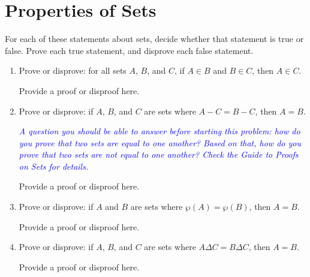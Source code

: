 \documentclass{article}
\renewcommand{\(}{\left(}
\renewcommand{\)}{\right)}
\theoremstyle{plain}
\theoremstyle{plain}
\theoremstyle{definition}
\begin{document}
\section{Properties of Sets}

For each of these statements about sets, decide whether that statement is true or false. Prove each true statement, and disprove each false statement.

\begin{enumerate}[label*=\roman*.,ref=\roman*]

\item Prove or disprove: for all sets $A$, $B$, and $C$,
if $A \in B$ and $B \in C$, then $A \in C$.

\begin{shaded}
Provide a proof or disproof here.
\end{shaded}

\item Prove or disprove: if $A$, $B$, and $C$ are sets where $A - C = B - C$, then $A = B$.

\textit{\textcolor{blue}{A question you should be able to answer before starting this problem: how do you prove that two sets are equal to one another? Based on that, how do you prove that two sets are not equal to one another? Check the Guide to Proofs on Sets for details.}}

\begin{shaded}
Provide a proof or disproof here.
\end{shaded}

\item Prove or disprove: if $A$ and $B$ are sets where $\wp(A) = \wp(B)$, then $A = B$.

\begin{shaded}
Provide a proof or disproof here.
\end{shaded}

\item Prove or disprove: if $A$, $B$, and $C$ are sets where $A \Delta C = B \Delta C$, then $A = B$.

\begin{shaded}
Provide a proof or disproof here.
\end{shaded}

\end{enumerate}
\end{document}
